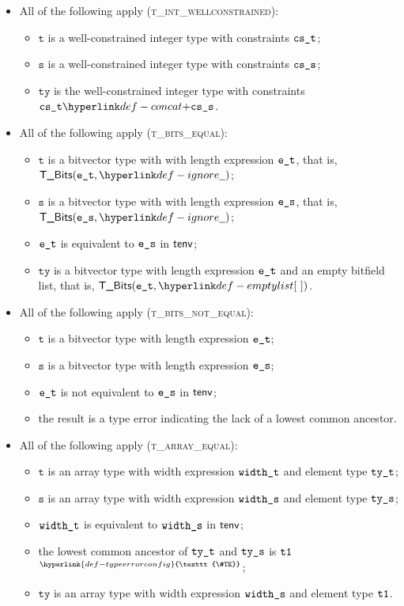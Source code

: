 \documentclass{book}
\newcommand\TypeErrorConfig[0]{\hyperlink{def-typeerrorconfig}{\texttt{\#TE}}}
\newcommand\ProseOrTypeError[0]{\hyperlink{def-proseortypeerror}{$^{\TypeErrorConfig}$}}
\newcommand\vt[0]{\texttt{t}}
\newcommand\vs[0]{\texttt{s}}
\newcommand\tty[0]{\texttt{ty}}
\begin{document}
\begin{itemize}
\begin{itemize}
    \item All of the following apply (\textsc{t\_int\_wellconstrained}):
    \begin{itemize}
      \item $\vt$ is a well-constrained integer type with constraints $\texttt{cs\_t}$;
      \item $\vs$ is a well-constrained integer type with constraints $\texttt{cs\_s}$;
      \item $\tty$ is the well-constrained integer type with constraints $\cst \concat \css$.
    \end{itemize}

    \item All of the following apply (\textsc{t\_bits\_equal}):
    \begin{itemize}
      \item $\vt$ is a bitvector type with with length expression $\texttt{e\_t}$, that is, $\TBits(\vet, \Ignore)$;
      \item $\vs$ is a bitvector type with with length expression $\texttt{e\_s}$, that is, $\TBits(\ves, \Ignore)$;
      \item $\texttt{e\_t}$ is equivalent to $\texttt{e\_s}$ in $\textsf{tenv}$;
      \item $\tty$ is a bitvector type with length expression $\texttt{e\_t}$ and an empty bitfield list, that is, $\TBits(\vet, \emptylist)$.
    \end{itemize}

    \item All of the following apply (\textsc{t\_bits\_not\_equal}):
    \begin{itemize}
      \item $\vt$ is a bitvector type with length expression $\texttt{e\_t}$;
      \item $\vs$ is a bitvector type with length expression $\texttt{e\_s}$;
      \item $\texttt{e\_t}$ is not equivalent to $\texttt{e\_s}$ in $\textsf{tenv}$;
      \item the result is a type error indicating the lack of a lowest common ancestor.
    \end{itemize}

    \item All of the following apply (\textsc{t\_array\_equal}):
    \begin{itemize}
      \item $\vt$ is an array type with width expression $\texttt{width\_t}$ and element type $\texttt{ty\_t}$;
      \item $\vs$ is an array type with width expression $\texttt{width\_s}$ and element type $\texttt{ty\_s}$;
      \item $\texttt{width\_t}$ is equivalent to $\texttt{width\_s}$ in $\textsf{tenv}$;
      \item the lowest common ancestor of $\texttt{ty\_t}$ and $\texttt{ty\_s}$ is $\texttt{t1}$ \ProseOrTypeError;
      \item $\tty$ is an array type with width expression $\texttt{width\_s}$ and element type $\texttt{t1}$.
    \end{itemize}


\end{itemize}
\end{itemize}
\end{document}
